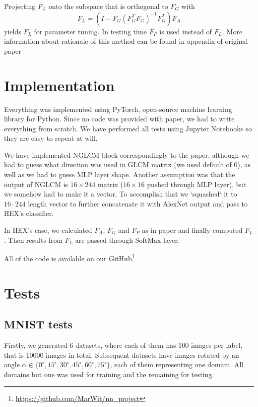 \documentclass{article} %
\begin{document}
Projecting $F_A$ onto the subspace that is orthogonal to $F_G$ with
$$F_L = (I - F_G(F_G^T F_G)^{-1} F_G^T) F_A$$
yields $F_L$ for parameter tuning. In testing time $F_P$ is used instead of $F_L$. More information about rationale of this method can be
found in appendix of original paper \citet{wang2018learning}

\pagebreak

\section{Implementation}

Everything was implemented using PyTorch, open-source machine learning library for Python. Since no code was provided with paper,
we had to write everything from scratch. We have performed all tests using Jupyter Notebooks so they are easy to repeat at will.

We have implemented NGLCM block correspondingly to the paper, although we had to guess what direction was used in 
GLCM matrix (we used default of 0), as well as we had to guess MLP layer shape. Another assumption was that the output
of NGLCM is $16\times244$ matrix ($16\times16$ pushed through MLP layer), but we somehow had to make it a vector. To accomplish that we `squashed`
it to $16\cdot244$ length vector to further concatenate it with AlexNet output and pass to HEX's classifier. 

In HEX's case, we calculated $F_A$, $F_G$ and $F_P$ as in paper and finally computed $F_L$. Then results from $F_L$ 
are passed through SoftMax layer.

All of the code is available on our GitHub\footnote{\url{https://github.com/MarWit/nn_project}}

\section{Tests}

\subsection{MNIST tests}

Firstly, we generated 6 datasets, where each of them has 100 images per label, that is 10000 images in total. Subsequent datasets have images rotated by an angle
$\alpha \in \{0^{\circ}, 15^{\circ}, 30^{\circ}, 45^{\circ}, 60^{\circ}, 75^{\circ}\}$, each of them representing one domain.    
All domains but one was used for training and the remaining for testing.
\end{document}
